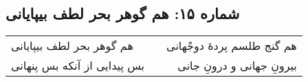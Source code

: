 \begin{center}
\section*{شماره ۱۵: هم گوهر بحر لطف بیپایانی}
\label{sec:015}
\begin{longtable}{l p{0.5cm} r}
هم گوهر بحر لطف بیپایانی
&&
هم گنج طلسم پردهٔ دوجْهانی
\\
بس پیدایی از آنکه بس پنهانی
&&
بیرونِ جهانی و درونِ جانی
\\
\end{longtable}
\end{center}
